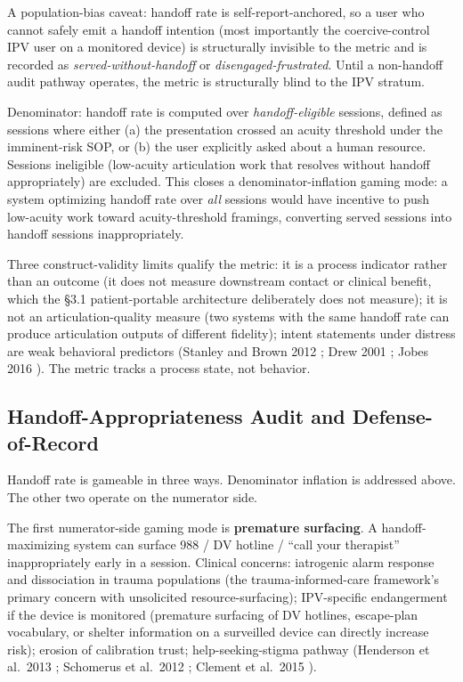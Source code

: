 \documentclass[letterpaper]{article}
\begin{document}
A population-bias caveat: handoff rate is self-report-anchored, so a user who cannot safely emit a handoff intention (most importantly the coercive-control IPV user on a monitored device) is structurally invisible to the metric and is recorded as \emph{served-without-handoff} or \emph{disengaged-frustrated}. Until a non-handoff audit pathway operates, the metric is structurally blind to the IPV stratum.

Denominator: handoff rate is computed over \emph{handoff-eligible} sessions, defined as sessions where either (a) the presentation crossed an acuity threshold under the imminent-risk SOP, or (b) the user explicitly asked about a human resource. Sessions ineligible (low-acuity articulation work that resolves without handoff appropriately) are excluded. This closes a denominator-inflation gaming mode: a system optimizing handoff rate over \emph{all} sessions would have incentive to push low-acuity work toward acuity-threshold framings, converting served sessions into handoff sessions inappropriately.

Three construct-validity limits qualify the metric: it is a process indicator rather than an outcome (it does not measure downstream contact or clinical benefit, which the \S3.1 patient-portable architecture deliberately does not measure); it is not an articulation-quality measure (two systems with the same handoff rate can produce articulation outputs of different fidelity); intent statements under distress are weak behavioral predictors (Stanley and Brown 2012 \citep{stanley2018spi}; Drew 2001 \citep{drew2001}; Jobes 2016 \citep{jobes2016cams}). The metric tracks a process state, not behavior.

\subsection{Handoff-Appropriateness Audit and Defense-of-Record}

Handoff rate is gameable in three ways. Denominator inflation is addressed above. The other two operate on the numerator side.

The first numerator-side gaming mode is \textbf{premature surfacing}. A handoff-maximizing system can surface 988 / DV hotline / ``call your therapist'' inappropriately early in a session. Clinical concerns: iatrogenic alarm response and dissociation in trauma populations (the trauma-informed-care framework's primary concern with unsolicited resource-surfacing); IPV-specific endangerment if the device is monitored (premature surfacing of DV hotlines, escape-plan vocabulary, or shelter information on a surveilled device can directly increase risk); erosion of calibration trust; help-seeking-stigma pathway (Henderson et al.~2013 \citep{henderson2013stigma}; Schomerus et al.~2012 \citep{schomerus2012stigma}; Clement et al.~2015 \citep{clement2015stigma}).
\end{document}
